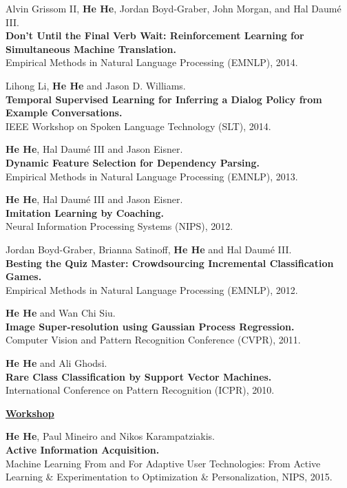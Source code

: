 \documentclass[margin,line]{resume}
\begin{document}
\begin{resume}
Alvin Grissom II, {\bf He He}, Jordan Boyd-Graber, John Morgan, and Hal Daum\'e III. \\
{\bf Don't Until the Final Verb Wait: Reinforcement Learning for Simultaneous Machine Translation.}\\
Empirical Methods in Natural Language Processing (EMNLP), 2014.%

Lihong Li, {\bf He He} and Jason D. Williams. \\
{\bf Temporal Supervised Learning for Inferring a Dialog Policy from Example Conversations.}\\
IEEE Workshop on Spoken Language Technology (SLT), 2014.%

{\bf He He}, Hal Daum\'e III and Jason Eisner.\\
{\bf Dynamic Feature Selection for Dependency Parsing.}\\ 
Empirical Methods in Natural Language Processing (EMNLP), 2013.%

{\bf He He}, Hal Daum\'e III and Jason Eisner.\\
{\bf Imitation Learning by Coaching.}\\ 
Neural Information Processing Systems (NIPS), 2012.%

Jordan Boyd-Graber, Brianna Satinoff, {\bf He He} and Hal Daum\'e III.\\
{\bf Besting the Quiz Master: Crowdsourcing Incremental Classification Games.}\\
Empirical Methods in Natural Language Processing (EMNLP), 2012.%

{\bf He He} and Wan Chi Siu. \\
{\bf Image Super-resolution using Gaussian Process Regression.}\\
Computer Vision and Pattern Recognition Conference (CVPR), 2011.%

{\bf He He} and Ali Ghodsi. \\
{\bf Rare Class Classification by Support Vector Machines.}\\
International Conference on Pattern Recognition (ICPR), 2010.

{\bf\underline{Workshop}}

{\bf He He}, Paul Mineiro and Nikos Karampatziakis. \\
{\bf Active Information Acquisition.}\\
Machine Learning From and For Adaptive User Technologies: From Active Learning \& Experimentation to Optimization \& Personalization, NIPS, 2015.%


\end{resume}
\end{document}
